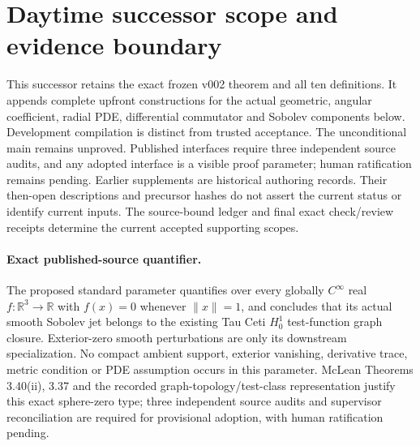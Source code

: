 \documentclass[11pt]{article}
\theoremstyle{definition}
\theoremstyle{remark}
\numberwithin{equation}{section}
\begin{document}
\clearpage
\section{Daytime successor scope and evidence boundary}
\label{daytime-v010:scope}
This successor retains the exact frozen v002 theorem and all ten definitions. It appends complete upfront constructions for the actual geometric, angular coefficient, radial PDE, differential commutator and Sobolev components below. Development compilation is distinct from trusted acceptance. The unconditional main remains unproved. Published interfaces require three independent source audits, and any adopted interface is a visible proof parameter; human ratification remains pending.
Earlier supplements are historical authoring records. Their then-open descriptions and precursor hashes do not assert the current status or identify current inputs. The source-bound ledger and final exact check/review receipts determine the current accepted supporting scopes.
\paragraph{Exact published-source quantifier.} The proposed standard parameter quantifies over every globally $C^\infty$ real $f:\mathbb R^3\to\mathbb R$ with $f(x)=0$ whenever $\|x\|=1$, and concludes that its actual smooth Sobolev jet belongs to the existing Tau Ceti $H^1_0$ test-function graph closure. Exterior-zero smooth perturbations are only its downstream specialization. No compact ambient support, exterior vanishing, derivative trace, metric condition or PDE assumption occurs in this parameter. McLean Theorems 3.40(ii), 3.37 and the recorded graph-topology/test-class representation justify this exact sphere-zero type; three independent source audits and supervisor reconciliation are required for provisional adoption, with human ratification pending.
\clearpage
\end{document}
